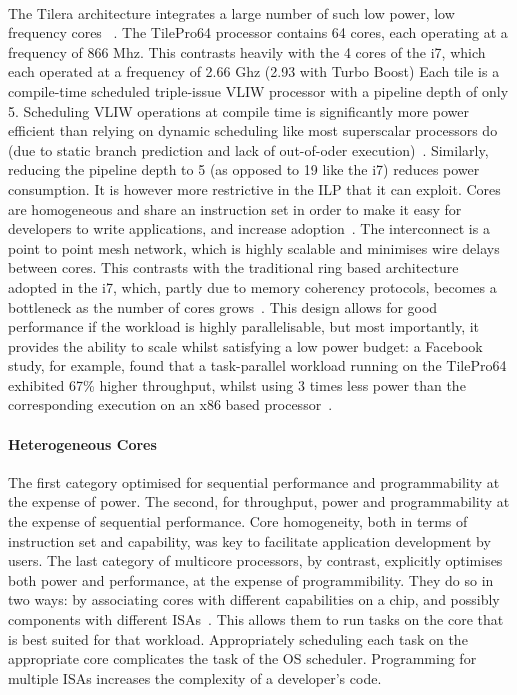 \paragraph{} The Tilera architecture  integrates a large number of such low power, 
low frequency cores ~\cite{wentzlaff2007tile}. The TilePro64 processor contains 
64 cores, each operating at a frequency of 866 Mhz. This contrasts heavily
with the 4 cores of the i7, which each operated at a frequency of 2.66 Ghz (2.93 with
Turbo Boost)  Each tile is a compile-time scheduled triple-issue VLIW processor with 
a pipeline depth of only 5. Scheduling VLIW operations at compile time is 
significantly more power efficient
than relying on dynamic scheduling like most superscalar processors do (due to
static branch prediction and lack of out-of-oder execution)~\cite{hennessy2006comparchquantitative}. Similarly,
reducing the pipeline depth to 5 (as opposed to 19 like the i7) reduces
power consumption. 
It is however more restrictive in the ILP that it can exploit. Cores are homogeneous and share 
an instruction set in order to make it easy for developers to write applications,
and increase adoption~\cite{wentzlaff2007tile}. The interconnect is a point to point mesh network, which
is highly scalable and minimises wire delays between cores. This
contrasts with the traditional ring based architecture adopted in the i7,  
which, partly due to memory coherency protocols, becomes a bottleneck
as the number of cores grows~\cite{1431574}. This design allows for good performance
if the workload is highly parallelisable, but most
importantly, it provides the ability to scale whilst satisfying a low power budget: 
a Facebook study, for example, found that a task-parallel workload running on the TilePro64 exhibited
67\% higher throughput, whilst using 3 times less power than the corresponding
execution on an x86 based processor~\cite{berezecki2011manycore}. 

\paragraph{Heterogeneous Cores} The first category optimised for 
sequential performance and programmability at the expense of power. The second, 
for throughput, power and programmability at the expense of sequential performance. 
Core homogeneity, both in terms of instruction set and capability,
was key to facilitate application development by users. The last category
of multicore processors, by contrast, explicitly optimises both
power and performance, at the expense of programmibility. They do so in two ways: 
by associating cores with different capabilities on a chip, and possibly components
with different ISAs~\cite{kumar:2004:SHM:998680.1006707,5695539,Kumar:2005:HCM:1100859.1100890,5695539}. This allows them to run tasks on the core
that is best suited for that workload. Appropriately scheduling each 
task on the appropriate core complicates the task of the OS scheduler.
Programming for multiple ISAs increases the complexity of a developer's code. 

